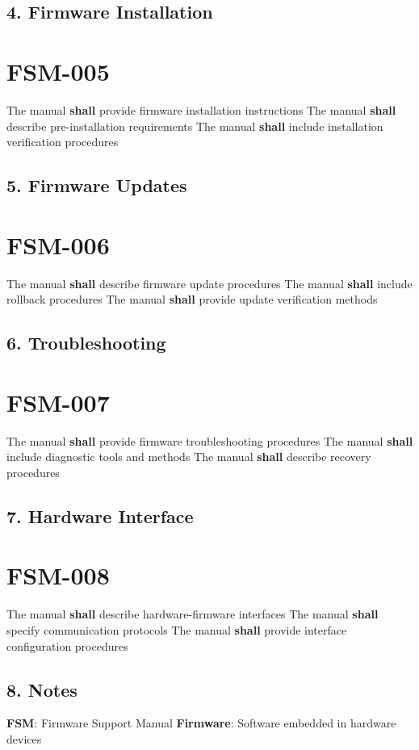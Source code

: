 \subsection{4. Firmware Installation}

\section{FSM-005}\label{FSM-005}

The manual \textbf{shall} provide firmware installation instructions
The manual \textbf{shall} describe pre-installation requirements
The manual \textbf{shall} include installation verification procedures

\subsection{5. Firmware Updates}

\section{FSM-006}\label{FSM-006}

The manual \textbf{shall} describe firmware update procedures
The manual \textbf{shall} include rollback procedures
The manual \textbf{shall} provide update verification methods

\subsection{6. Troubleshooting}

\section{FSM-007}\label{FSM-007}

The manual \textbf{shall} provide firmware troubleshooting procedures
The manual \textbf{shall} include diagnostic tools and methods
The manual \textbf{shall} describe recovery procedures

\subsection{7. Hardware Interface}

\section{FSM-008}\label{FSM-008}

The manual \textbf{shall} describe hardware-firmware interfaces
The manual \textbf{shall} specify communication protocols
The manual \textbf{shall} provide interface configuration procedures

\subsection{8. Notes}
\textbf{FSM}: Firmware Support Manual
\textbf{Firmware}: Software embedded in hardware devices

